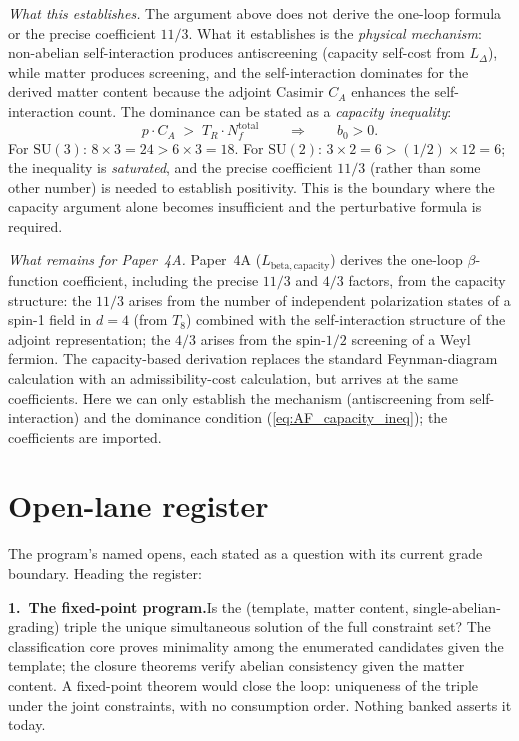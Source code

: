 \documentclass[11pt]{article}
\theoremstyle{definition}
\newcommand{\SU}{\mathrm{SU}}
\begin{document}
\noindent\textit{What this establishes.}\quad
The argument above does not derive the one-loop formula or the
precise coefficient $11/3$.  What it establishes is the \emph{physical
mechanism}: non-abelian self-interaction produces antiscreening
(capacity self-cost from $L_\Delta$), while matter produces screening,
and the self-interaction dominates for the derived matter content
because the adjoint Casimir $C_A$ enhances the self-interaction
count.  The dominance can be stated as a \emph{capacity inequality}:
\begin{equation}\label{eq:AF_capacity_ineq}
  p \cdot C_A \;>\; T_R \cdot N_f^{\mathrm{total}}
  \qquad\Longrightarrow\qquad b_0 > 0.
\end{equation}
For $\SU(3)$: $8 \times 3 = 24 > 6 \times 3 = 18$.  For $\SU(2)$:
$3 \times 2 = 6 > (1/2) \times 12 = 6$; the inequality is
\emph{saturated}, and the precise coefficient $11/3$ (rather than
some other number) is needed to establish positivity.  This is
the boundary where the capacity argument alone becomes insufficient
and the perturbative formula is required.

\smallskip\noindent\textit{What remains for Paper~4A.}\quad
Paper~4A ($L_{\mathrm{beta,capacity}}$) derives the one-loop
$\beta$-function coefficient, including the precise $11/3$ and $4/3$
factors, from the capacity structure: the $11/3$ arises from the
number of independent polarization states of a spin-1 field in $d = 4$
(from $T_8$) combined with the self-interaction structure of the
adjoint representation; the $4/3$ arises from the spin-$1/2$ screening
of a Weyl fermion.  The capacity-based derivation replaces the
standard Feynman-diagram calculation with an admissibility-cost
calculation, but arrives at the same coefficients.  Here we can only
establish the mechanism (antiscreening from self-interaction) and the
dominance condition (\ref{eq:AF_capacity_ineq}); the coefficients are
imported.




\section{Open-lane register}
\label{sec:open_lanes}

The program's named opens, each stated as a question with its current
grade boundary.  Heading the register:

\smallskip\noindent\textbf{1.\ The fixed-point program.}\quad Is the
(template, matter content, single-abelian-grading) triple the unique
simultaneous solution of the full constraint set?  The classification
core proves minimality among the enumerated candidates given the
template; the closure theorems verify abelian consistency given the
matter content.  A fixed-point theorem would close the loop:
uniqueness of the triple under the joint constraints, with no
consumption order.  Nothing banked asserts it today.
\end{document}
